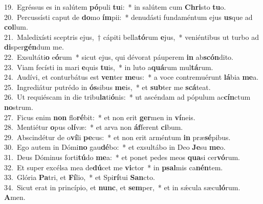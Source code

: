 {19.~}Egréssus es in salútem \textbf{pó}puli \textbf{tu}i:~* in salútem cum \textbf{Chri}sto \textbf{tu}o.\\
{20.~}Percussísti caput de \textbf{do}mo \textbf{ím}pii:~* denudásti fundaméntum ejus \textbf{us}que ad \textbf{col}lum.\\
{21.~}Maledixísti sceptris ejus,~† cápiti bella\textbf{tó}rum \textbf{e}jus,~* veniéntibus ut turbo ad \textbf{di}sper\textbf{gén}dum me.\\
{22.~}Exsultáti\textbf{o} e\textbf{ó}rum~* sicut ejus, qui dévorat páuperem \textbf{in} ab\textbf{scón}dito.\\
{23.~}Viam fecísti in mari \textbf{e}quis \textbf{tu}is,~* in luto a\textbf{quá}rum mul\textbf{tá}rum.\\
{24.~}Audívi, et conturbátus est \textbf{ven}ter \textbf{me}us:~* a voce contremuérunt \textbf{lá}bia \textbf{me}a.\\
{25.~}Ingrediátur putrédo in \textbf{ós}sibus \textbf{me}is,~* et \textbf{sub}ter me \textbf{scá}teat.\\
{26.~}Ut requiéscam in die tribu\textbf{la}ti\textbf{ó}nis:~* ut ascéndam ad pópulum ac\textbf{cín}ctum \textbf{no}strum.\\
{27.~}Ficus enim \textbf{non} flo\textbf{ré}bit:~* et non erit \textbf{ger}men in \textbf{ví}neis.\\
{28.~}Mentiétur \textbf{o}pus o\textbf{lí}væ:~* et arva non \textbf{áf}ferent \textbf{ci}bum.\\
{29.~}Abscindétur de o\textbf{ví}li \textbf{pe}cus:~* et non erit arméntum \textbf{in} præ\textbf{sé}pibus.\\
{30.~}Ego autem in Dómi\textbf{no} gau\textbf{dé}bo:~* et exsultábo in Deo \textbf{Je}su \textbf{me}o.\\
{31.~}Deus Dóminus forti\textbf{tú}do \textbf{me}a:~* et ponet pedes meos \textbf{qua}si cer\textbf{vó}rum.\\
{32.~}Et super excélsa mea de\textbf{dú}cet me \textbf{vi}ctor~* in \textbf{psal}mis ca\textbf{nén}tem.\\
{33.~}Glória \textbf{Pa}tri, et \textbf{Fí}lio,~* et Spi\textbf{rí}tui \textbf{San}cto.\\
{34.~}Sicut erat in princípio, et \textbf{nunc}, et \textbf{sem}per,~* et in sǽcula sæcu\textbf{ló}rum. \textbf{A}men.\\
